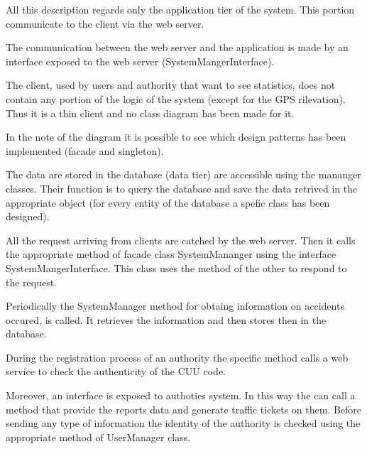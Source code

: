 All this description regards only the application tier of the system. This portion communicate to the client via the web server.

 The communication between the web server and the application is made by an interface exposed to the web server (SystemMangerInterface).
 
The client, used by users and authority that want to see statistics, does not contain any portion of the logic of the system (except for the GPS rilevation). Thus it is a thin client and no class diagram has been made for it.

In the note of the diagram it is possible to see which design patterns has been implemented (facade and singleton).

The data are stored in the database (data tier) are accessible using the mananger classes. Their function is to query the database and save the data retrived in the appropriate object (for every entity of the database a spefic class has been designed).

All the request arriving from clients are catched by the web server. Then it calls the appropriate method of facade class SystemMananger using the interface SystemMangerInterface. This class uses the method of the other to respond to the request.

Periodically the SystemManager method for obtaing information on accidents occured, is called. It retrieves the information and then stores then in the database.

During the registration process of an authority the specific method calls a web service to check the authenticity of the CUU code.

Moreover, an interface is exposed to authoties system. In this way the can call a method that provide the reports data and generate traffic tickets on them. Before sending any type of information the identity of the authority is checked using the appropriate method of UserManager class.

